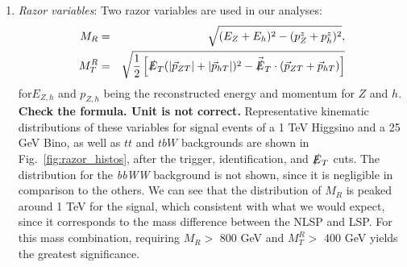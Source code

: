 \documentclass[a4paper,11pt]{article}
\newcommand{\Shufang}[1]{{\bf\color{Maroon}  #1}}
\begin{document}
\begin{enumerate}
  \item \emph{Razor variables}:  Two razor variables are used in our analyses: 
\begin{align}
M_R &=& \sqrt{(E_Z+E_h)^2 - (p_Z^z + p_h^z)^2},\\
M_T^R &=& \sqrt{\frac{1}{2}\left[\slashed{E}_T(|\vec{p}_{ZT}|+|\vec{p}_{hT}|)^2
- \vec{\slashed{E}}_T\cdot(\vec{p}_{ZT}+\vec{p}_{hT})\right]}
\end{align}
 for$E_{Z,h}$ and $p_{Z,h}$ being the reconstructed energy and momentum for $Z$ and $h$.
\Shufang{Check the formula.  Unit is not correct.}
    Representative kinematic
  distributions of these variables for signal events of a 1 TeV Higgsino and a 25 GeV Bino, as well as $tt$ and $tbW$ backgrounds are
  shown in Fig.~\ref{fig:razor_histos}, after the trigger, identification, and
  $\slashed{E}_{T}$ cuts. The
  distribution for the \emph{bbWW} background is not shown, since it is negligible in
  comparison to the others.   We can see that the distribution of $M_R$ is peaked
  around 1 TeV for the signal, which consistent with what we would expect, since
  it corresponds to the mass difference between the NLSP and LSP.  For this mass combination, requiring $M_R >$ 800
  GeV and $M_T^R >$ 400 GeV yields the greatest significance.

\end{enumerate}
\end{document}

